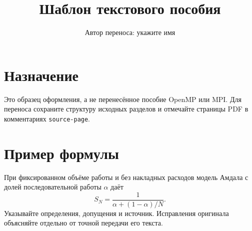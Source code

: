 \documentclass[a4paper,11pt]{article}
\title{Шаблон текстового пособия}
\author{Автор переноса: укажите имя}
\date{}
\begin{document}
\maketitle
\section{Назначение}
Это образец оформления, а не перенесённое пособие OpenMP или MPI.
Для переноса сохраните структуру исходных разделов и отмечайте страницы
PDF в комментариях \texttt{source-page}.
\section{Пример формулы}
При фиксированном объёме работы и без накладных расходов модель Амдала
с долей последовательной работы $\alpha$ даёт
\[
 S_N=\frac{1}{\alpha+(1-\alpha)/N}.
\]
Указывайте определения, допущения и источник. Исправления оригинала
объясняйте отдельно от точной передачи его текста.
\end{document}
